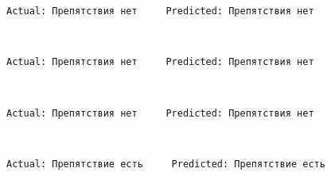 \documentclass[11pt]{article}
\begin{document}
    \begin{Verbatim}[commandchars=\\\{\}]
Actual: Препятствия нет     Predicted: Препятствия нет

    \end{Verbatim}

    \begin{center}
    \end{center}
    { \hspace*{\fill} \\}
    
    \begin{Verbatim}[commandchars=\\\{\}]
Actual: Препятствия нет     Predicted: Препятствия нет

    \end{Verbatim}

    \begin{center}
    \end{center}
    { \hspace*{\fill} \\}
    
    \begin{Verbatim}[commandchars=\\\{\}]
Actual: Препятствия нет     Predicted: Препятствия нет

    \end{Verbatim}

    \begin{center}
    \end{center}
    { \hspace*{\fill} \\}
    
    \begin{Verbatim}[commandchars=\\\{\}]
Actual: Препятствие есть     Predicted: Препятствие есть

    \end{Verbatim}

    \begin{center}
    \end{center}
    { \hspace*{\fill} \\}
    
\end{document}
